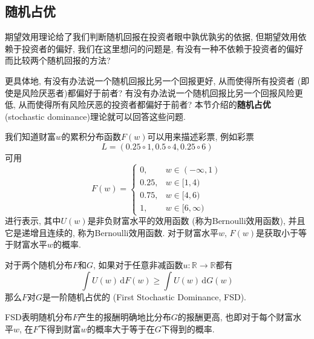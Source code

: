 \documentclass[cn, 12pt, math=mtpro2, bibstyle=apa, blue]{elegantbook}
\newcommand{\R}{\mathbb{R}}
\begin{document}
\subsection{随机占优}
期望效用理论给了我们判断随机回报在投资者眼中孰优孰劣的依据, 但期望效用依赖于投资者的偏好, 我们在这里想问的问题是, 有没有一种不依赖于投资者的偏好而比较两个随机回报的方法? 

更具体地, 有没有办法说一个随机回报比另一个回报更好, 从而使得所有投资者 (即使是风险厌恶者)都偏好于前者? 有没有办法说一个随机回报比另一个回报风险更低, 从而使得所有风险厌恶的投资者都偏好于前者? 本节介绍的\textbf{随机占优 }(stochastic dominance)理论就可以回答这些问题.

我们知道财富$w$的累积分布函数$F(w)$可以用来描述彩票, 例如彩票
$$L=(0.25\circ 1, 0.5\circ 4, 0.25\circ 6)$$
可用
$$F(w)=\begin{cases}
         0, & w\in (-\infty,1) \\
         0.25, & w\in [1,4) \\
         0.75, & w\in [4,6) \\
         1, & w\in[6,\infty)
       \end{cases}$$
进行表示, 其中$U(w)$是非负财富水平的效用函数 (称为Bernoulli效用函数), 并且它是递增且连续的, 称为Bernoulli效用函数. 对于财富水平$w$, $F(w)$是获取小于等于财富水平$w$的概率.

\begin{definition}[一阶随机占优]
对于两个随机分布$F$和$G$, 如果对于任意非减函数$u:\R\to\R$都有
$$\int U(w)\,\text{d}F(w)\geq \int U(w)\,\text{d}G(w)$$
那么$F$对$G$是一阶随机占优的 (First Stochastic Dominance, FSD).
\end{definition} 
FSD表明随机分布$F$产生的报酬明确地比分布$G$的报酬更高, 也即对于每个财富水平$w$, 在$F$下得到财富$w$的概率大于等于在$G$下得到的概率.
\end{document}

